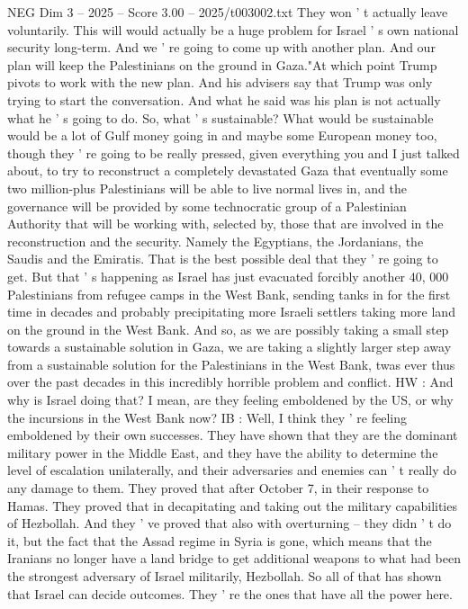 \begin{textsample}{NEG Dim 3 – 2025 – Score 3.00 – 2025/t003002.txt}
They won ' t actually leave voluntarily.
This will would actually be a huge problem for Israel ' s own national security long-term.
And we ' re going to come up with another plan.
And our plan will keep the Palestinians on the ground in Gaza."At which point Trump pivots to work with the new plan.
And his advisers say that Trump was only trying to start the conversation.
And what he said was his plan is not actually what he ' s going to do.
So, what ' s sustainable?
What would be sustainable would be a lot of Gulf money going in and maybe some European money too, though they ' re going to be really pressed, given everything you and I just talked about, to try to reconstruct a completely devastated Gaza that eventually some two million-plus Palestinians will be able to live normal lives in, and the governance will be provided by some technocratic group of a Palestinian Authority that will be working with, selected by, those that are involved in the reconstruction and the security.
Namely the Egyptians, the Jordanians, the Saudis and the Emiratis.
That is the best possible deal that they ' re going to get.
But that ' s happening as Israel has just evacuated forcibly another 40, 000 Palestinians from refugee camps in the West Bank, sending tanks in for the first time in decades and probably precipitating more Israeli settlers taking more land on the ground in the West Bank.
And so, as we are possibly taking a small step towards a sustainable solution in Gaza, we are taking a slightly larger step away from a sustainable solution for the Palestinians in the West Bank, twas ever thus over the past decades in this incredibly horrible problem and conflict.
HW : And why is Israel doing that?
I mean, are they feeling emboldened by the US, or why the incursions in the West Bank now?
IB : Well, I think they ' re feeling emboldened by their own successes.
They have shown that they are the dominant military power in the Middle East, and they have the ability to determine the level of escalation unilaterally, and their adversaries and enemies can ' t really do any damage to them.
They proved that after October 7, in their response to Hamas.
They proved that in decapitating and taking out the military capabilities of Hezbollah.
And they ' ve proved that also with overturning -- they didn ' t do it, but the fact that the Assad regime in Syria is gone, which means that the Iranians no longer have a land bridge to get additional weapons to what had been the strongest adversary of Israel militarily, Hezbollah.
So all of that has shown that Israel can decide outcomes.
They ' re the ones that have all the power here.

\end{textsample}
